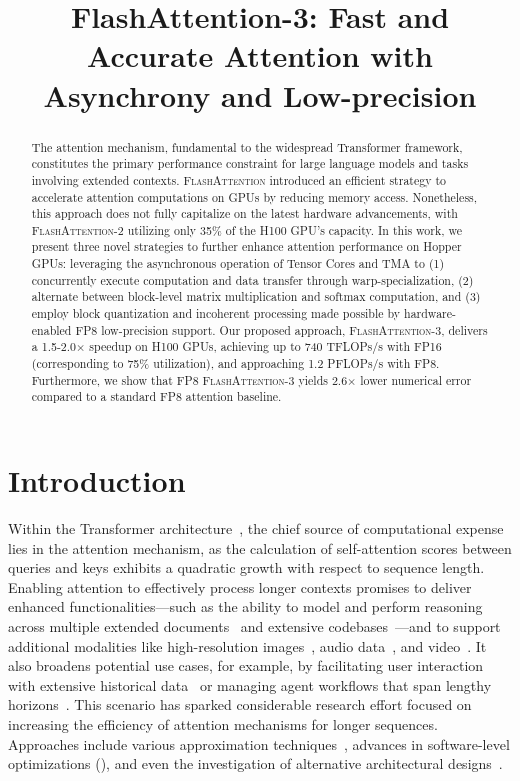 \title{FlashAttention-3: Fast and Accurate Attention with Asynchrony and Low-precision}

\begin{abstract}
The attention mechanism, fundamental to the widespread Transformer framework, constitutes the primary performance constraint for large language models and tasks involving extended contexts. \textsc{FlashAttention} introduced an efficient strategy to accelerate attention computations on GPUs by reducing memory access. Nonetheless, this approach does not fully capitalize on the latest hardware advancements, with \textsc{FlashAttention-2} utilizing only 35\% of the H100 GPU’s capacity. In this work, we present three novel strategies to further enhance attention performance on Hopper GPUs: leveraging the asynchronous operation of Tensor Cores and TMA to (1) concurrently execute computation and data transfer through warp-specialization, (2) alternate between block-level matrix multiplication and softmax computation, and (3) employ block quantization and incoherent processing made possible by hardware-enabled FP8 low-precision support. Our proposed approach, \textsc{FlashAttention-3}, delivers a 1.5-2.0$\times$ speedup on H100 GPUs, achieving up to 740 TFLOPs/s with FP16 (corresponding to 75\% utilization), and approaching 1.2 PFLOPs/s with FP8. Furthermore, we show that FP8 \textsc{FlashAttention-3} yields 2.6$\times$ lower numerical error compared to a standard FP8 attention baseline.
\end{abstract}

\section{Introduction}
\label{sec:intro}

Within the Transformer architecture~\citep{vaswani2017attention}, the chief source of computational expense lies in the attention mechanism, as the calculation of self-attention scores between queries and keys exhibits a quadratic growth with respect to sequence length. Enabling attention to effectively process longer contexts promises to deliver enhanced functionalities—such as the ability to model and perform reasoning across multiple extended documents~\citep{guo2021longt5,shaham2022scrolls,peng2023yarn} and extensive codebases~\citep{roziere2023code, li2023starcoder}—and to support additional modalities like high-resolution images~\citep{chen2022scaling}, audio data~\citep{gulati2020conformer}, and video~\citep{ho2022video}. It also broadens potential use cases, for example, by facilitating user interaction with extensive historical data~\citep{sun2019bert4rec} or managing agent workflows that span lengthy horizons~\citep{yao2022react}. This scenario has sparked considerable research effort focused on increasing the efficiency of attention mechanisms for longer sequences. Approaches include various approximation techniques~\citep{katharopoulos2020transformers,choromanski2020rethinking,tay2020efficient}, advances in software-level optimizations (\citep{rabe2021self,dao2022flashattention,kwon2023efficient}), and even the investigation of alternative architectural designs~\citep{peng2023rwkv,sun2023retentive,gu2023mamba}.

